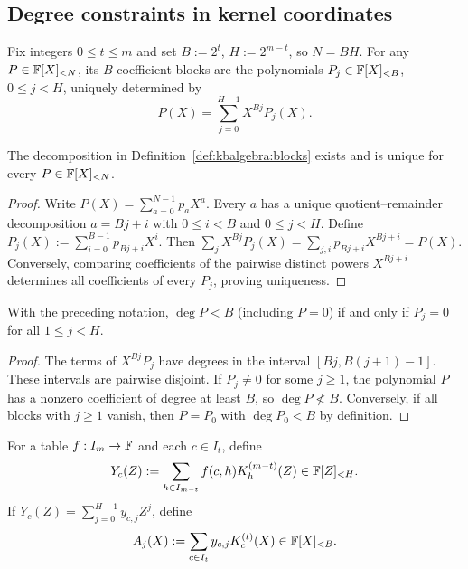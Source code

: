 \subsection{Degree constraints in kernel coordinates}\label{sec:kbalgebra:lowdeg}

\begin{definition}\label{def:kbalgebra:blocks}
Fix integers $0\leq t\leq m$ and set $B:=2^t$, $H:=2^{m-t}$, so $N=BH$. For any $P\in\mathbb{F}[X]_{<N}$, its $B$-coefficient blocks are the polynomials $P_j\in\mathbb{F}[X]_{<B}$, $0\leq j<H$, uniquely determined by
\[
 P(X)=\sum_{j=0}^{H-1}X^{Bj}P_j(X).
\]
\end{definition}

\begin{lemma}\label{lem:kbalgebra:block-unique}
The decomposition in Definition~\ref{def:kbalgebra:blocks} exists and is unique for every $P\in\mathbb{F}[X]_{<N}$.
\end{lemma}
\begin{proof}
Write $P(X)=\sum_{a=0}^{N-1}p_aX^a$. Every $a$ has a unique quotient--remainder decomposition $a=Bj+i$ with $0\leq i<B$ and $0\leq j<H$. Define $P_j(X):=\sum_{i=0}^{B-1}p_{Bj+i}X^i$. Then
$\sum_jX^{Bj}P_j(X)=\sum_{j,i}p_{Bj+i}X^{Bj+i}=P(X)$. Conversely, comparing coefficients of the pairwise distinct powers $X^{Bj+i}$ determines all coefficients of every $P_j$, proving uniqueness.
\end{proof}

\begin{lemma}\label{lem:kbalgebra:degree-blocks}
With the preceding notation, $\deg P<B$ (including $P=0$) if and only if $P_j=0$ for all $1\leq j<H$.
\end{lemma}
\begin{proof}
The terms of $X^{Bj}P_j$ have degrees in the interval $[Bj,B(j+1)-1]$. These intervals are pairwise disjoint. If $P_j\neq0$ for some $j\geq1$, the polynomial $P$ has a nonzero coefficient of degree at least $B$, so $\deg P\not<B$. Conversely, if all blocks with $j\geq1$ vanish, then $P=P_0$ with $\deg P_0<B$ by definition.
\end{proof}

\begin{definition}\label{def:kbalgebra:high-block}
For a table $f:I_m\to\mathbb{F}$ and each $c\in I_t$, define
\[
 Y_c(Z):=\sum_{h\in I_{m-t}} f(c,h)K_h^{(m-t)}(Z)\in\mathbb{F}[Z]_{<H}.
\]
If $Y_c(Z)=\sum_{j=0}^{H-1}y_{c,j}Z^j$, define
\[
 A_j(X):=\sum_{c\in I_t}y_{c,j}K_c^{(t)}(X)\in\mathbb{F}[X]_{<B}.
\]
\end{definition}

